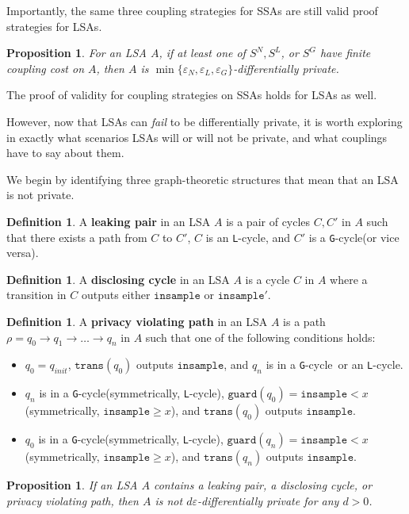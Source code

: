 \documentclass[12pt]{article}
\newcommand{\gguard}[1][x]{\texttt{insample}\geq #1}
\newcommand{\lguard}[1][x]{\texttt{insample} < #1}
\newcommand{\guard}{\texttt{guard}}
\newcommand{\trans}{\texttt{trans}}
\newcommand{\gcycle}{\texttt{G}-cycle}
\newcommand{\lcycle}{\texttt{L}-cycle}
\newtheorem{prop}[thm]{Proposition}
\theoremstyle{definition}
\newtheorem{defn}[thm]{Definition}
\begin{document}
Importantly, the same three coupling strategies for SSAs are still valid proof strategies for LSAs. 

\begin{prop}\label{LSAcouplingsvalid}
    For an LSA $A$, if at least one of $S^N, S^L$, or $S^G$ have finite coupling cost on $A$, then $A$ is $\min\{\varepsilon_N, \varepsilon_L, \varepsilon_G\}$-differentially private. 
\end{prop}

The proof of validity for coupling strategies on SSAs holds for LSAs as well.

However, now that LSAs can \textit{fail} to be differentially private, it is worth exploring in exactly what scenarios LSAs will or will not be private, and what couplings have to say about them.

We begin by identifying three graph-theoretic structures that mean that an LSA is not private. 

\begin{defn}
    A \textbf{leaking pair} in an LSA $A$ is a pair of cycles $C, C'$ in $A$ such that there exists a path from $C$ to $C'$, $C$ is an \lcycle, and $C'$ is a \gcycle(or vice versa). 
\end{defn}

\begin{defn}
    A \textbf{disclosing cycle} in an LSA $A$ is a cycle $C$ in $A$ where a transition in $C$ outputs either $\texttt{insample}$ or $\texttt{insample}'$.
\end{defn}

\begin{defn}
    A \textbf{privacy violating path} in an LSA $A$ is a path $\rho = q_0\to q_1\to\ldots\to q_n$ in $A$ such that one of the following conditions holds:\begin{itemize}
        \item $q_0= q_{init}$, $\trans(q_0)$ outputs $\texttt{insample}$, and $q_n$ is in a \gcycle\ or an \lcycle.
        \item $q_n$ is in a \gcycle (symmetrically, \lcycle), $\guard(q_0) =\lguard$ (symmetrically, $\gguard$), and $\trans(q_0)$ outputs $\texttt{insample}$.
        \item $q_0$ is in a \gcycle (symmetrically, \lcycle), $\guard(q_n) =\lguard$ (symmetrically, $\gguard$), and $\trans(q_n)$ outputs $\texttt{insample}$.
    \end{itemize}
\end{defn}

\begin{prop}\label{LSAnotwellformed}
    If an LSA $A$ contains a leaking pair, a disclosing cycle, or privacy violating path, then $A$ is not $d\varepsilon$-differentially private for any $d>0$. 
\end{prop}
\end{document}
